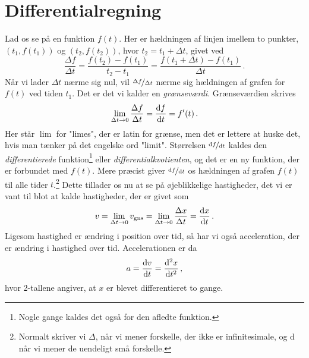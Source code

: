 \section{Differentialregning} \label{mat:sec:diff}
Lad os se på en funktion $f(t)$. Her er hældningen af linjen imellem to punkter, $\left(t_1,f(t_1)\right)$ og $\left(t_2,f(t_2)\right)$, hvor $t_2 = t_1 + \Delta t$, givet ved
%
\begin{equation*}
    \frac{\Delta f}{\Delta t}=\frac{f(t_2)-f(t_1)}{t_2-t_1}=\frac{f(t_1+\Delta t)-f(t_1)}{\Delta t} \, .
\end{equation*}
%
Når vi lader $\Delta t$ nærme sig nul, vil $\nicefrac{\Delta f}{\Delta t}$ nærme sig hældningen af grafen for $f(t)$ ved tiden $t_1$. Det er det vi kalder en \emph{grænseværdi}. Grænseværdien skrives
\begin{equation} \label{mat:eq:diffkvotient}
\lim_{\Delta t\rightarrow 0}\frac{\Delta f}{\Delta t}=\dv{f}{t}=f'(t) \, .
\end{equation}
Her står $\lim$ for "limes", der er latin for grænse, men det er lettere at huske det, hvis man tænker på det engelske ord "limit". Størrelsen $\nicefrac{\dd f}{\dd t}$ kaldes den \emph{differentierede} funktion\footnote{Nogle gange kaldes det også for den afledte funktion.} eller \textit{differentialkvotienten}, og det er en ny funktion, der er forbundet med $f(t)$. Mere præcist giver $\nicefrac{\dd f}{\dd t}$ os hældningen af grafen $f(t)$ til alle tider $t$.\footnote{Normalt skriver vi $\Delta$, når vi mener forskelle, der ikke er infinitesimale, og d når vi mener de uendeligt små forskelle.}
%
Dette tillader os nu at se på øjeblikkelige hastigheder, det vi er vant til blot at kalde hastigheder, der er givet som
\begin{equation}
v=\lim_{\Delta t\rightarrow 0}v_\text{gns}= \lim_{\Delta t\rightarrow 0} \frac{\Delta x}{\Delta t} = \dv{x}{t}\label{mat:eq:hast} \, .
\end{equation}
Ligesom hastighed er ændring i position over tid, så har vi også acceleration, der er ændring i hastighed over tid. Accelerationen er da 
\begin{equation} \label{mat:eq:acceleration}
    a=\dv{v}{t}=\dv[2]{x}{t} \, ,
\end{equation}
hvor 2-tallene angiver, at $x$ er blevet differentieret to gange.

